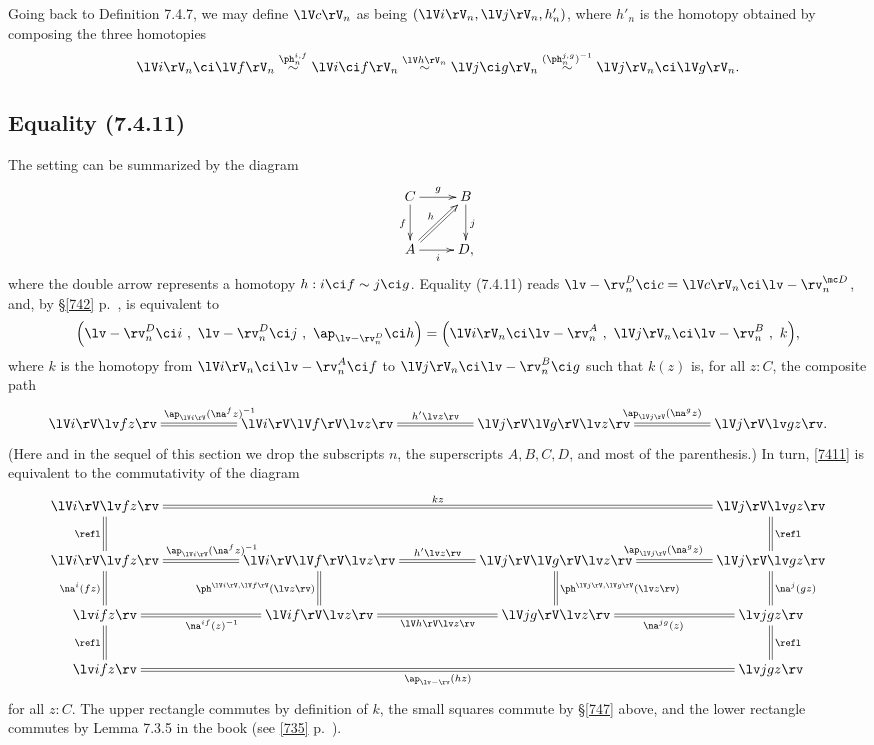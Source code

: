 \documentclass[12pt]{article}
\begin{document}
Going back to Definition 7.4.7, we may define $\lV c\rV_n$ as being $(\lV i\rV_n,\lV j\rV_n,h'_n)$, where $h'_n$ is the homotopy obtained by composing the three homotopies
$$
\lV i\rV_n\ci\lV f\rV_n\overset{\ph_n^{i,f}}{\sim}\lV i\ci f\rV_n\overset{\lV h\rV_n}{\sim}\lV j\ci g\rV_n\overset{(\ph_n^{j,g})^{-1}}{\sim}\lV j\rV_n\ci\lV g\rV_n.
$$


\subsection{Equality (7.4.11)}

The setting can be summarized by the diagram 
$$
\xymatrix{C\ar[r]^g\ar[d]_f&B\ar[d]^j\\ A\ar[r]_i\ar@{=>}[ur]^h&D,}
$$ 
where the double arrow represents a homotopy $h:i\ci f\sim j\ci g$. Equality (7.4.11) reads $\lv-\rv^D_n\ci c=\lV c\rV_n\ci\lv-\rv^{\mc D}_n$, and, by \S\ref{742} p.~\pageref{742}, is equivalent to
\begin{equation}\label{7411}
\Big(\lv-\rv^D_n\ci i\ ,\ \lv-\rv^D_n\ci j\ ,\ \ap_{\lv-\rv^D_n}\ci h\Big)
=
\Big(\lV i\rV_n\ci\lv-\rv^A_n\ ,\ \lV j\rV_n\ci\lv-\rv^B_n\ ,\ k\Big),
\end{equation}
where $k$ is the homotopy from $\lV i\rV_n\ci\lv-\rv^A_n\ci f$ to $\lV j\rV_n\ci\lv-\rv^B_n\ci g$ such that $k(z)$ is, for all $z:C$, the composite path
$$
\xymatrix{
\lV i\rV\lv fz\rv&&
\lV i\rV\lV f\rV\lv z\rv\ar@{=}[ll]_{\ap_{\lV i\rV}(\na^fz)^{-1}}\ar@{=}[rr]^{h'\lv z\rv}&&
\lV j\rV\lV g\rV\lv z\rv\ar@{=}[rr]^{\ap_{\lV j\rV}(\na^gz)}&&
\lV j\rV\lv gz\rv.}
$$ 
(Here and in the sequel of this section we drop the subscripts $n$, the superscripts $A,B,C,D$, and most of the parenthesis.) In turn, \eqref{7411} is equivalent to the commutativity of the diagram %
$$ 
\xymatrix{
\lV i\rV\lv fz\rv\ar@{=}[d]_{\refl}\ar@{=}[rrrrrr]^{kz}&&&&&&\lV j\rV\lv gz\rv\ar@{=}[d]^{\refl}\\
\lV i\rV\lv fz\rv\ar@{=}[d]_{\na^i(fz)}&&
\lV i\rV\lV f\rV\lv z\rv\ar@{=}[ll]_{\ap_{\lV i\rV}(\na^fz)^{-1}}\ar@{=}[d]_{\ph^{\lV i\rV,\lV f\rV}(\lv z\rv)}\ar@{=}[rr]^{h'\lv z\rv}&&
\lV j\rV\lV g\rV\lv z\rv\ar@{=}[d]^{\ph^{\lV j\rV,\lV g\rV}(\lv z\rv)}\ar@{=}[rr]^{\ap_{\lV j\rV}(\na^gz)}&&
\lV j\rV\lv gz\rv\ar@{=}[d]^{\na^j(gz)}\\
%
\lv ifz\rv&&\lV if\rV\lv z\rv\ar@{=}[rr]_{\lV h\rV\lv z\rv}\ar@{=}[ll]^{\na^{if}(z)^{-1}}&&\lV jg\rV\lv z\rv\ar@{=}[rr]_{\na^{jg}(z)}&&\lv jgz\rv\\ 
\lv ifz\rv\ar@{=}[u]^{\refl}\ar@{=}[rrrrrr]_{\ap_{\lv-\rv}(hz)}&&&&&&\lv jgz\rv\ar@{=}[u]_{\refl}}
$$ 
for all $z:C$. The upper rectangle commutes by definition of $k$, the small squares commute by \S\ref{747} above, and the lower rectangle commutes by Lemma 7.3.5 in the book (see \eqref{735} p.~\pageref{735}).
\end{document}

